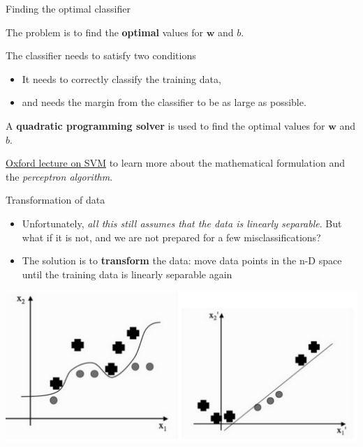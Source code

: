 \documentclass[compress]{beamer}
\begin{document}
\begin{frame}{Finding the optimal classifier}

The problem is to find the \textbf{optimal} values for $\mathbf{w}$ and
$b$.

The classifier needs to satisfy two conditions

\begin{itemize}

\item It needs to correctly classify the training data,
\item and needs the margin from the classifier to be as large as possible.
\end{itemize}

\pause

A \textbf{quadratic programming solver} is used to find the optimal
values for $\mathbf{w}$ and $b$.

{\footnotesize \href{http://www.robots.ox.ac.uk/~az/lectures/ml/lect2.pdf}{Oxford lecture on SVM} to learn more about the mathematical
    formulation and the \emph{perceptron algorithm}.}

\end{frame}

\begin{frame}{Transformation of data}

\begin{itemize}

    \item Unfortunately, \emph{all this still assumes that the data is linearly
        separable}. But what if it is not, and we are not prepared for a few
  misclassifications?
\item The solution is to \textbf{transform} the data: move data points in
  the n-D space until the training data is linearly separable again
\end{itemize}

    \begin{center}
        \includegraphics[width=0.8\linewidth]{svm-kernels}
    \end{center}
\end{frame}
\end{document}
